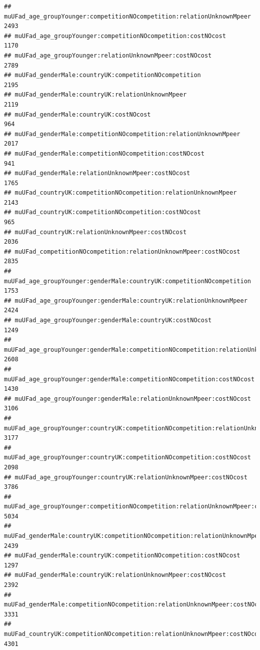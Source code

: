 \documentclass[
]{article}
\begin{document}
\begin{verbatim}
## muUFad_age_groupYounger:competitionNOcompetition:relationUnknownMpeer                 2493
## muUFad_age_groupYounger:competitionNOcompetition:costNOcost                           1170
## muUFad_age_groupYounger:relationUnknownMpeer:costNOcost                               2789
## muUFad_genderMale:countryUK:competitionNOcompetition                                  2195
## muUFad_genderMale:countryUK:relationUnknownMpeer                                      2119
## muUFad_genderMale:countryUK:costNOcost                                                 964
## muUFad_genderMale:competitionNOcompetition:relationUnknownMpeer                       2017
## muUFad_genderMale:competitionNOcompetition:costNOcost                                  941
## muUFad_genderMale:relationUnknownMpeer:costNOcost                                     1765
## muUFad_countryUK:competitionNOcompetition:relationUnknownMpeer                        2143
## muUFad_countryUK:competitionNOcompetition:costNOcost                                   965
## muUFad_countryUK:relationUnknownMpeer:costNOcost                                      2036
## muUFad_competitionNOcompetition:relationUnknownMpeer:costNOcost                       2835
## muUFad_age_groupYounger:genderMale:countryUK:competitionNOcompetition                 1753
## muUFad_age_groupYounger:genderMale:countryUK:relationUnknownMpeer                     2424
## muUFad_age_groupYounger:genderMale:countryUK:costNOcost                               1249
## muUFad_age_groupYounger:genderMale:competitionNOcompetition:relationUnknownMpeer      2608
## muUFad_age_groupYounger:genderMale:competitionNOcompetition:costNOcost                1430
## muUFad_age_groupYounger:genderMale:relationUnknownMpeer:costNOcost                    3106
## muUFad_age_groupYounger:countryUK:competitionNOcompetition:relationUnknownMpeer       3177
## muUFad_age_groupYounger:countryUK:competitionNOcompetition:costNOcost                 2098
## muUFad_age_groupYounger:countryUK:relationUnknownMpeer:costNOcost                     3786
## muUFad_age_groupYounger:competitionNOcompetition:relationUnknownMpeer:costNOcost      5034
## muUFad_genderMale:countryUK:competitionNOcompetition:relationUnknownMpeer             2439
## muUFad_genderMale:countryUK:competitionNOcompetition:costNOcost                       1297
## muUFad_genderMale:countryUK:relationUnknownMpeer:costNOcost                           2392
## muUFad_genderMale:competitionNOcompetition:relationUnknownMpeer:costNOcost            3331
## muUFad_countryUK:competitionNOcompetition:relationUnknownMpeer:costNOcost             4301

\end{verbatim}
\end{document}
